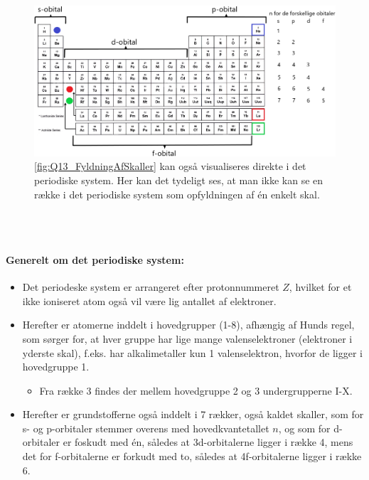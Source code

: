 \begin{figure}[!h]
    \centering
    \includegraphics[width=\textwidth]{Q13/images/PeriodicTable.png}
    \caption{\cref{fig:Q13_FyldningAfSkaller} kan også visualiseres direkte i det periodiske system. Her kan det tydeligt ses, at man ikke kan se en række i det periodiske system som opfyldningen af én enkelt skal.}
    \label{fig:Q13_OpfyldningAfSkallerMedPeriodiskSystem}
\end{figure}
$ $\\\\

\paragraph{Generelt om det periodiske system:}
\begin{itemize}
    \item Det periodeske system er arrangeret efter protonnummeret $Z$, hvilket for et ikke ioniseret atom også vil være lig antallet af elektroner.
    \item Herefter er atomerne inddelt i hovedgrupper (1-8), afhængig af Hunds regel, som sørger for, at hver gruppe har lige mange valenselektroner (elektroner i yderste skal), f.eks. har alkalimetaller kun 1 valenselektron, hvorfor de ligger i hovedgruppe 1.
    \begin{itemize}
        \item Fra række 3 findes der mellem hovedgruppe 2 og 3 undergrupperne I-X.
    \end{itemize}
    \item Herefter er grundstofferne også inddelt i 7 rækker, også kaldet skaller, som for s- og p-orbitaler stemmer overens med hovedkvantetallet $n$, og som for d-orbitaler er foskudt med én, således at 3d-orbitalerne ligger i række 4, mens det for f-orbitalerne er forkudt med to, således at 4f-orbitalerne ligger i række 6.
\end{itemize}


